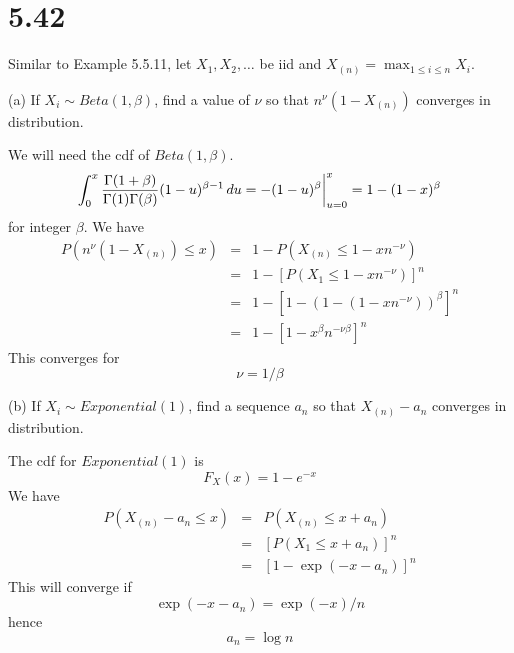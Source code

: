 \section*{5.42}
Similar to Example 5.5.11, let $X_1,X_2,\ldots$ be iid and
$X_{(n)}=\max_{1\le i\le n}X_i$.

\bigskip
\noindent
(a) If $X_i\sim Beta(1,\beta)$, find a value of $\nu$ so that
$n^\nu (1-X_{(n)})$ converges in distribution.

\bigskip
\noindent
We will need the cdf of $Beta(1,\beta)$.
$$\int_0^x{\Gamma(1+\beta)\over\Gamma(1)\Gamma(\beta)}
(1-u)^{\beta-1}\,du=-(1-u)^\beta\bigg|_{u=0}^x=1-(1-x)^\beta$$
for integer $\beta$. We have
\begin{eqnarray*}
P(n^\nu(1-X_{(n)})\le x)&=&1-P(X_{(n)}\le1-xn^{-\nu})\\
&=&1-[P(X_1\le1-xn^{-\nu})]^n\\
&=&1-[1-(1-(1-xn^{-\nu}))^\beta]^n\\
&=&1-[1-x^\beta n^{-\nu\beta}]^n
\end{eqnarray*}
This converges for
$$\nu=1/\beta$$

\bigskip
\noindent
(b) If $X_i\sim Exponential(1)$, find a sequence $a_n$ so that
$X_{(n)}-a_n$ converges in distribution.

\bigskip
\noindent
The cdf for $Exponential(1)$ is
$$F_X(x)=1-e^{-x}$$
We have
\begin{eqnarray*}
P(X_{(n)}-a_n\le x)&=&P(X_{(n)}\le x+a_n)\\
&=&[P(X_1\le x+a_n)]^n\\
&=&[1-\exp(-x-a_n)]^n
\end{eqnarray*}
This will converge if
$$\exp(-x-a_n)=\exp(-x)/n$$
hence
$$a_n=\log n$$

